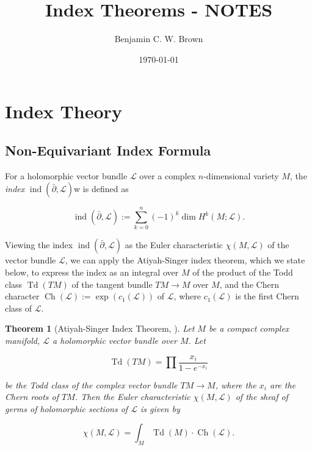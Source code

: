 \documentclass[11pt]{amsart}
\title{Index Theorems - NOTES}
\author{Benjamin C. W. Brown}
\date{\today}
\newtheorem{theorem}{Theorem}[section]
\newcommand{\ra}{\rightarrow}
\newcommand{\mcL}{\mathcal{L}}
\newcommand{\dbar}{\bar{\partial}}
\DeclareMathOperator{\ind}{ind}
\DeclareMathOperator{\Td}{Td}
\DeclareMathOperator{\Ch}{Ch}
\begin{document}
\maketitle
 

\section{Index Theory} \label{sec:index-theory}

\subsection{Non-Equivariant Index Formula} \label{subsec:non-equivariant-index-formula}

For a holomorphic vector bundle $\mcL$ over a complex $n$-dimensional variety $M$, the \emph{index} $\ind(\dbar, \mcL)$w is defined as

\begin{equation*}
	\ind(\dbar, \mcL) := \sum\limits_{k = 0}^{n}(-1)^{k}\dim H^{k}(M; \mcL).
\end{equation*}

Viewing the index $\ind(\dbar, \mcL)$ as the Euler characteristic $\chi(M, \mcL)$ of the vector bundle $\mcL$, we can apply the Atiyah-Singer index theorem, which we state below, to express the index as an integral over $M$ of the product of the Todd class $\Td(TM)$ of the tangent bundle $TM \ra M$ over $M$, and the Chern character $\Ch(\mcL) := \exp(c_{1}(\mcL))$ of $\mcL$, where $c_{1}(\mcL)$ is the first Chern class of $\mcL$.

\begin{theorem}[Atiyah-Singer Index Theorem, \cite{MAIS1968}]
	\label{thm:atiyah-singer-index-theorem}
	Let $M$ be a compact complex manifold, $\mcL$ a holomorphic vector bundle over $M$. Let

	\begin{equation*}
		\Td(TM) = \prod \frac{x_{i}}{1 - e^{-x_{i}}}
	\end{equation*}

	be the Todd class of the complex vector bundle $TM \ra M$, where the $x_{i}$ are the Chern roots of $TM$. Then the Euler characteristic $\chi(M, \mcL)$ of the sheaf of germs of holomorphic sections of $\mcL$ is given by
	
	\begin{equation*}
		\chi(M, \mcL) = \int_{M} \Td(M)\cdot \Ch(\mcL).
	\end{equation*}
\end{theorem}
\end{document}
